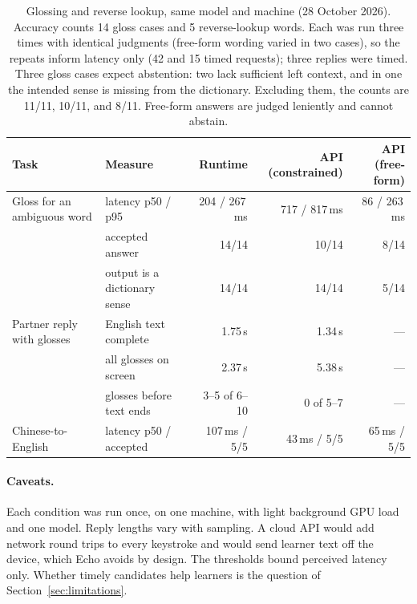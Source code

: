 \documentclass[11pt,a4paper]{article}
\begin{document}
\begin{table}[ht]
\centering\footnotesize\setlength{\tabcolsep}{4pt}
\begin{tabular}{@{}llrrr@{}}
\toprule
Task & Measure & Runtime & API (constrained) & API (free-form)\\
\midrule
Gloss for an ambiguous word & latency p50 / p95 & 204 / 267\,ms & 717 / 817\,ms & 86 / 263\,ms\\
 & accepted answer & 14/14 & 10/14 & 8/14\\
 & output is a dictionary sense & 14/14 & 14/14 & 5/14\\
\addlinespace
Partner reply with glosses & English text complete & 1.75\,s & 1.34\,s & ---\\
 & all glosses on screen & 2.37\,s & 5.38\,s & ---\\
 & glosses before text ends & 3--5 of 6--10 & 0 of 5--7 & ---\\
\addlinespace
Chinese-to-English & latency p50 / accepted & 107\,ms / 5/5 & 43\,ms / 5/5 & 65\,ms / 5/5\\
\bottomrule
\end{tabular}
\caption{Glossing and reverse lookup, same model and machine (28 October 2026). Accuracy counts 14 gloss cases and 5 reverse-lookup words. Each was run three times with identical judgments (free-form wording varied in two cases), so the repeats inform latency only (42 and 15 timed requests); three replies were timed. Three gloss cases expect abstention: two lack sufficient left context, and in one the intended sense is missing from the dictionary. Excluding them, the counts are 11/11, 10/11, and 8/11. Free-form answers are judged leniently and cannot abstain.}
\label{tab:comparison}
\end{table}

\paragraph{Caveats.} Each condition was run once, on one machine, with light background GPU load and one model. Reply lengths vary with sampling. A cloud API would add network round trips to every keystroke and would send learner text off the device, which Echo avoids by design. The thresholds bound perceived latency only. Whether timely candidates help learners is the question of Section~\ref{sec:limitations}.
\end{document}
